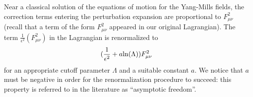 Near a classical solution of the equations of motion for the 
Yang-Mills fields, the correction terms entering the perturbation
expansion are proportional to ${F_{\mu \nu}^2}$ 
(recall that a term of the form ${F_{\mu \nu}^2}$  appeared in our
original Lagrangian).
The term $\frac{1}{\epsilon^2} (F_{\mu \nu}^2 ) $ in the Lagrangian
is renormalized to 
$$(\frac{1}{\epsilon^2} + a {\rm ln} (\Lambda)  )
 F_{\mu \nu}^2   $$ for an appropriate cutoff parameter
$\Lambda$ and a suitable constant $a$. We notice that $a$ must be negative
in order for the renormalization procedure to succeed:
this property is referred to in the literature as ``asymptotic freedom''.






 






